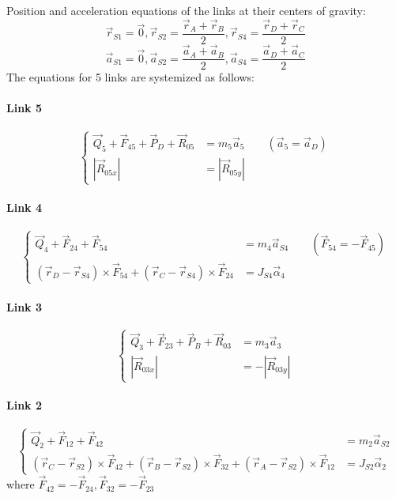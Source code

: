 Position and acceleration equations of the links at their centers of gravity:
\begin{equation}\label{rS}
	\vec{r}_{S1}=\vec{0},\vec{r}_{S2}=\dfrac{\vec{r}_A+\vec{r}_B}{2},\vec{r}_{S4}=\dfrac{\vec{r}_D+\vec{r}_C}{2}
\end{equation}
\begin{equation}
\vec{a}_{S1}=\vec{0},\vec{a}_{S2}=\dfrac{\vec{a}_A+\vec{a}_B}{2},\vec{a}_{S4}=\dfrac{\vec{a}_D+\vec{a}_C}{2}
\end{equation}
The equations for 5 links are systemized as follows:
\paragraph{Link 5}
\begin{equation}
	\left\{
	\begin{array}{cl}
	\vec{Q}_{5}+\vec{F}_{45}+\vec{P}_D+\vec{R}_{05}&=m_5\vec{a}_5\qquad(\vec{a}_5=\vec{a}_D)\\
	\left|\vec{R}_{05x}\right|&=\left|\vec{R}_{05y}\right|
	\end{array} 
	\right.
\end{equation}
\paragraph{Link 4}
\begin{equation}
\left\{
\begin{array}{cl}
\vec{Q}_{4}+\vec{F}_{24}+\vec{F}_{54}&=m_4\vec{a}_{S4}\qquad(\vec{F}_{54}=-\vec{F}_{45})\\
(\vec{r}_D-\vec{r}_{S4})\times \vec{F}_{54}+(\vec{r}_C-\vec{r}_{S4})\times \vec{F}_{24}&=J_{S4}\vec{\alpha}_4
\end{array} 
\right.
\end{equation}
\paragraph{Link 3}
\begin{equation}
\left\{
\begin{array}{cl}
\vec{Q}_{3}+\vec{F}_{23}+\vec{P}_B+\vec{R}_{03}&=m_3\vec{a}_3\\
\left|\vec{R}_{03x}\right|&=-\left|\vec{R}_{03y}\right|
\end{array} 
\right.
\end{equation}
\paragraph{Link 2}
\begin{equation}
	\left\{
	\begin{array}{cl}
	\vec{Q}_{2}+\vec{F}_{12}+\vec{F}_{42}&=m_2\vec{a}_{S2}\\
	(\vec{r}_C-\vec{r}_{S2})\times \vec{F}_{42}+(\vec{r}_B-\vec{r}_{S2})\times \vec{F}_{32}+(\vec{r}_A-\vec{r}_{S2})\times \vec{F}_{12}&=J_{S2}\vec{\alpha}_2
	\end{array} 
	\right.
\end{equation}
where $ \vec{F}_{42}=-\vec{F}_{24}, \vec{F}_{32}=-\vec{F}_{23} $
